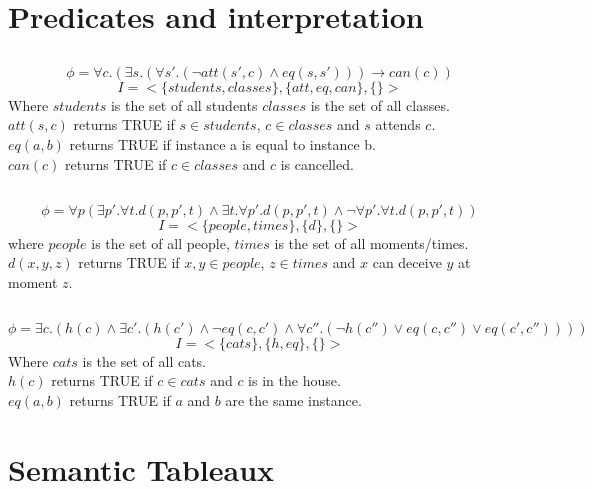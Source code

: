 \documentclass[]{article}
\begin{document}
\lstset{language=Prolog}

\section{Predicates and interpretation}
\subsection{}
$$
\phi = \forall c.(\exists s.(\forall s'.(\neg att(s',c)\wedge eq(s,s')))\rightarrow can(c))
$$
$$I = <\{students, classes\},\{att, eq, can\}, \{\}>$$
Where $students$ is the set of all students $classes$ is the set of all classes.\\
$att(s,c)$ returns TRUE if $s\in students$, $c\in classes$ and $s$ attends $c$.\\
$eq(a,b)$ returns TRUE if instance a is equal to instance b.\\
$can(c)$ returns TRUE if $c\in classes$ and $c$ is cancelled.
\subsection{}
$$\phi = \forall p(\exists p'.\forall t.d(p,p',t) \wedge \exists t.\forall p'.d(p,p',t) \wedge \neg\forall p'.\forall t.d(p,p',t))$$
$$I = <\{people, times\}, \{d\}, \{\}>$$
where $people$ is the set of all people, $times$ is the set of all moments/times.\\ $d(x,y,z)$ returns TRUE if $x,y\in people$, $z\in times$ and $x$ can deceive $y$ at moment $z$.
\subsection{}
$$
\phi = \exists c.(h(c)\wedge \exists c'.(h(c') \wedge \neg eq(c,c')\wedge \forall c''.(\neg h(c'')\vee eq(c,c'')\vee eq(c',c''))))
$$
$$
I = <\{cats\},\{h, eq\}, \{\}>
$$
Where $cats$ is the set of all cats.\\
$h(c)$ returns TRUE if $c\in cats$ and $c$ is in the house.\\
$eq(a,b)$ returns TRUE if $a$ and $b$ are the same instance.\\
\section{Semantic Tableaux}
\end{document}
